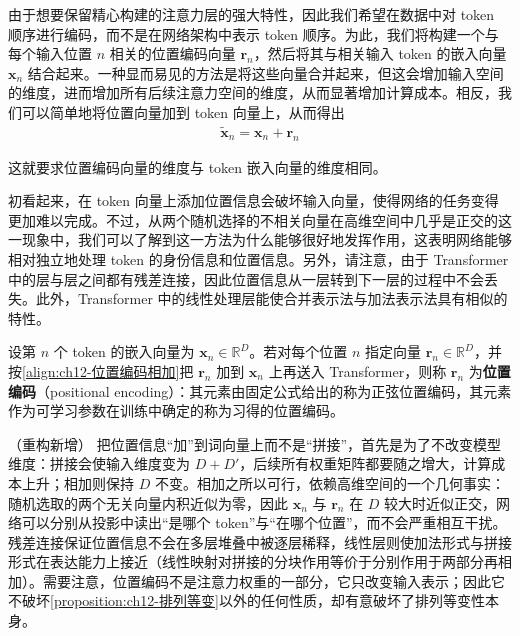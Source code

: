 \documentclass[../../main.tex]{subfiles}
\begin{document}
由于想要保留精心构建的注意力层的强大特性，因此我们希望在数据中对 token 顺序进行编码，而不是在网络架构中表示 token 顺序。为此，我们将构建一个与每个输入位置 $n$ 相关的位置编码向量 $\mathbf{r}_n$，然后将其与相关输入 token 的嵌入向量 $\mathbf{x}_n$ 结合起来。一种显而易见的方法是将这些向量合并起来，但这会增加输入空间的维度，进而增加所有后续注意力空间的维度，从而显著增加计算成本。相反，我们可以简单地将位置向量加到 token 向量上，从而得出
\begin{align}
\tilde{\mathbf{x}}_n=\mathbf{x}_n+\mathbf{r}_n
\label{align:ch12-位置编码相加}
\end{align}

这就要求位置编码向量的维度与 token 嵌入向量的维度相同。

初看起来，在 token 向量上添加位置信息会破坏输入向量，使得网络的任务变得更加难以完成。不过，从两个随机选择的不相关向量在高维空间中几乎是正交的这一现象中，我们可以了解到这一方法为什么能够很好地发挥作用，这表明网络能够相对独立地处理 token 的身份信息和位置信息。另外，请注意，由于 Transformer 中的层与层之间都有残差连接，因此位置信息从一层转到下一层的过程中不会丢失。此外，Transformer 中的线性处理层能使合并表示法与加法表示法具有相似的特性。

\begin{definition}[位置编码]\label{definition:ch12-位置编码}
设第 $n$ 个 token 的嵌入向量为 $\mathbf{x}_n\in\mathbb{R}^{D}$。若对每个位置 $n$ 指定向量 $\mathbf{r}_n\in\mathbb{R}^{D}$，并按\eqref{align:ch12-位置编码相加}把 $\mathbf{r}_n$ 加到 $\mathbf{x}_n$ 上再送入 Transformer，则称 $\mathbf{r}_n$ 为\textbf{位置编码}（positional encoding）：其元素由固定公式给出的称为正弦位置编码，其元素作为可学习参数在训练中确定的称为习得的位置编码。
\end{definition}

\begin{remark}（重构新增）
把位置信息“加”到词向量上而不是“拼接”，首先是为了不改变模型维度：拼接会使输入维度变为 $D+D'$，后续所有权重矩阵都要随之增大，计算成本上升；相加则保持 $D$ 不变。相加之所以可行，依赖高维空间的一个几何事实：随机选取的两个无关向量内积近似为零，因此 $\mathbf{x}_n$ 与 $\mathbf{r}_n$ 在 $D$ 较大时近似正交，网络可以分别从投影中读出“是哪个 token”与“在哪个位置”，而不会严重相互干扰。残差连接保证位置信息不会在多层堆叠中被逐层稀释，线性层则使加法形式与拼接形式在表达能力上接近（线性映射对拼接的分块作用等价于分别作用于两部分再相加）。需要注意，位置编码不是注意力权重的一部分，它只改变输入表示；因此它不破坏\cref{proposition:ch12-排列等变}以外的任何性质，却有意破坏了排列等变性本身。
\end{remark}
\end{document}
